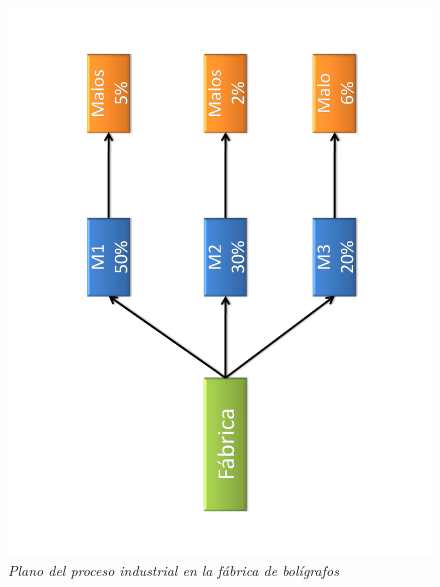 \begin{Eje}
\begin{figure}[!h]
\centering
\includegraphics[angle=-90, scale=0.5]{Fabrica1.pdf}
\caption{\emph{Plano del proceso industrial en la fábrica de bolígrafos}}
\end{figure}


\end{Eje}
